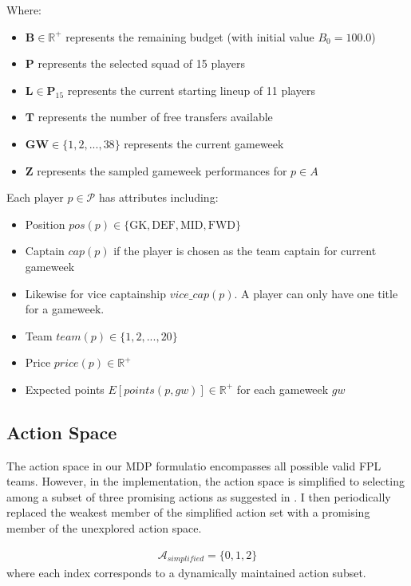 Where:
\begin{itemize}
    \item $\mathbf{B} \in \mathbb{R}^+$ represents the remaining budget (with initial value $B_0 = 100.0$)
    \item $\mathbf{P}$ represents the selected squad of 15 players
    \item $\mathbf{L} \in \mathbf{P}_{15}$ represents the current starting lineup of 11 players 
    \item $\mathbf{T}$ represents the number of free transfers available
    \item $\mathbf{GW} \in \{1, 2, ..., 38\}$ represents the current gameweek
    \item $\mathbf{Z}$ represents the sampled gameweek performances for $p \in A$
\end{itemize}

Each player $p \in \mathcal{P}$ has attributes including:
\begin{itemize}
    \item Position $pos(p) \in \{\text{GK}, \text{DEF}, \text{MID}, \text{FWD}\}$
    \item Captain $cap(p)$ if the player is chosen as the team captain for current gameweek
    \item Likewise for vice captainship $vice\_cap(p)$. A player can only have one title for a gameweek.
    \item Team $team(p) \in \{1, 2, ..., 20\}$ 
    \item Price $price(p) \in \mathbb{R}^+$
    \item Expected points $E[points(p, gw)] \in \mathbb{R}^+$ for each gameweek $gw$
\end{itemize}

\subsection{Action Space} \label{action_space}
The action space in our MDP formulatio encompasses all possible valid FPL teams.
However, in the implementation, the action space is simplified to selecting among a subset of three promising actions as suggested in \cite{matthews2012}. I then periodically replaced the weakest member of the simplified action set with a promising member of the unexplored action space.

\begin{align}
\mathcal{A}_{simplified} = \{0, 1, 2\}
\end{align}
where each index corresponds to a dynamically maintained action subset.

